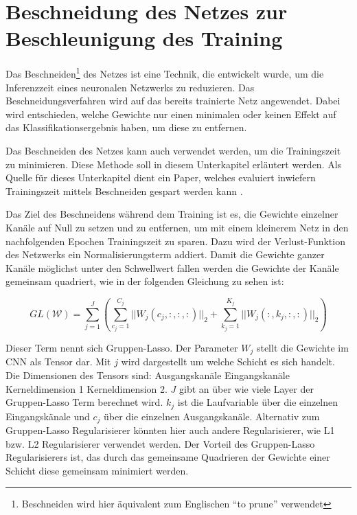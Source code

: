 \section{Beschneidung des Netzes zur Beschleunigung des Training}
\label{sec:prunetrain}
Das Beschneiden\footnote{Beschneiden wird hier äquivalent zum Englischen  "`to prune"' verwendet} des Netzes ist eine Technik, die entwickelt wurde, um die Inferenzzeit eines neuronalen Netzwerks zu reduzieren. Das Beschneidungsverfahren wird auf das bereits trainierte Netz angewendet. Dabei wird entschieden, welche Gewichte nur einen minimalen oder keinen Effekt auf das Klassifikationsergebnis haben, um diese zu entfernen.

Das Beschneiden des Netzes kann auch verwendet werden, um die Trainingszeit zu minimieren. Diese Methode soll in diesem Unterkapitel erläutert werden. Als Quelle für dieses Unterkapitel dient ein Paper, welches evaluiert inwiefern Trainingszeit mittels Beschneiden gespart werden kann \cite{prunetrain}.


Das Ziel des Beschneidens während dem Training ist es, die Gewichte einzelner Kanäle auf Null zu setzen und zu entfernen, um mit einem kleinerem Netz in den nachfolgenden Epochen Trainingszeit zu sparen. Dazu wird der Verlust-Funktion des Netzwerks ein Normalisierungsterm addiert. Damit die Gewichte ganzer Kanäle möglichst unter den Schwellwert fallen werden die Gewichte der Kanäle gemeinsam quadriert, wie in der folgenden Gleichung zu sehen ist:

\begin{equation}
GL(\mathcal{W})=\sum_{j=1}^{J} \left( \sum_{c_j=1}^{C_j} || W_{j} (c_j,:,:,:) ||_2 + \sum_{k_j=1}^{K_j} || W_{j}(:,k_j,:,:)||_2 \right)
 \label{equ:PTloss}
\end{equation}

Dieser Term nennt sich Gruppen-Lasso. Der Parameter $W_{j}$ stellt die Gewichte im CNN als Tensor dar. Mit $j$ wird dargestellt um welche Schicht es sich handelt. Die Dimensionen des Tensors sind: Ausgangskanäle \texttimes Eingangskanäle \texttimes Kerneldimension 1 \texttimes Kerneldimension 2. $J$ gibt an über wie viele Layer der Gruppen-Lasso Term berechnet wird. $k_j$ ist die Laufvariable über die einzelnen Eingangskänale und $c_j$ über die einzelnen Ausgangskanäle. Alternativ zum Gruppen-Lasso Regularisierer könnten hier auch andere Regularisierer, wie L1 bzw. L2 Regularisierer verwendet werden. Der Vorteil des Gruppen-Lasso Regularisierers ist, das durch das gemeinsame Quadrieren der Gewichte einer Schicht diese gemeinsam minimiert werden.


